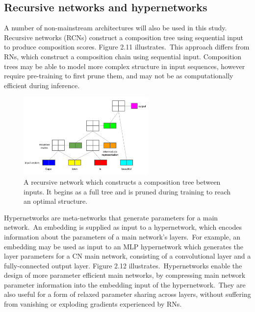 \subsection{Recursive networks and hypernetworks}

A number of non-mainstream architectures will also be used in this study. Recursive networks (RCNs) construct a composition tree using sequential input to produce composition scores. Figure 2.11 illustrates.\ This approach differs from RNs, which construct a composition chain using sequential input. Composition trees may be able to model more complex structure in input sequences, however require pre-training to first prune them, and may not be as computationally efficient during inference. \par

\begin{figure}[H]
   	\centering
    	\includegraphics[width=0.6\textwidth, height=0.4\textwidth]{recursive_network.png}
	\captionsetup{justification=centering}
	\caption{A recursive network which constructs a composition tree between inputs. It begins as a full tree and is pruned during training to reach an optimal structure.}
\end{figure}

\noindent Hypernetworks are meta-networks that generate parameters for a main network.\ An embedding is supplied as input to a hypernetwork, which encodes information about the parameters of a main network's layers.\ For example, an embedding may be used as input to an MLP hypernetwork which generates the layer parameters for a CN main network, consisting of a convolutional layer and a fully-connected output layer. Figure 2.12 illustrates.\ Hypernetworks enable the design of more parameter efficient main networks, by compressing main network parameter information into the embedding input of the hypernetwork.\ They are also useful for a form of relaxed parameter sharing across layers, without suffering from vanishing or exploding gradients experienced by RNs. 

